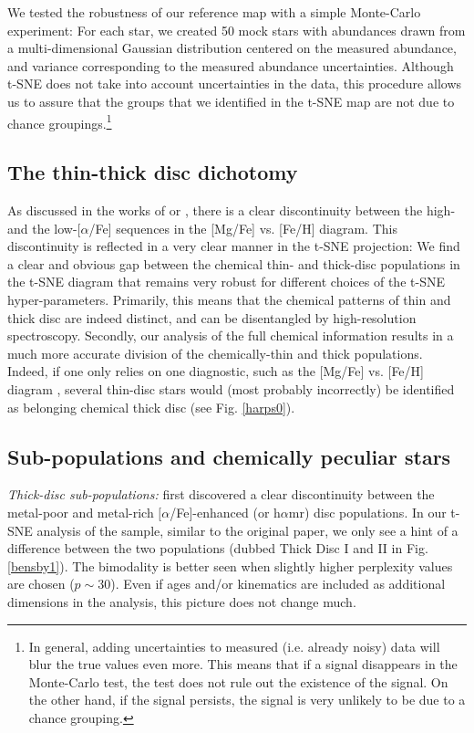 \documentclass{aa}  %
\begin{document}
We tested the robustness of our reference map with a simple Monte-Carlo experiment: For each star, we created 50 mock stars with abundances drawn from a multi-dimensional Gaussian distribution centered on the measured abundance, and variance corresponding to the measured abundance uncertainties. Although t-SNE does not take into account uncertainties in the data, this procedure allows us to assure that the groups that we identified in the t-SNE map are not due to chance groupings.\footnote{In general, adding uncertainties to measured (i.e. already noisy) data will blur the true values even more. This means that if a signal disappears in the Monte-Carlo test, the test does not rule out the existence of the signal. On the other hand, if the signal persists, the signal is very unlikely to be due to a chance grouping.} 

\subsection{The thin-thick disc dichotomy} 

As discussed in the works of \citet{Adibekyan2011, Adibekyan2012} or \citet{DelgadoMena2017}, there is a clear discontinuity between the high- and the low-[$\alpha$/Fe] sequences in the [Mg/Fe] vs. [Fe/H] diagram. This discontinuity is reflected in a very clear manner in the t-SNE projection:
We find a clear and obvious gap between the chemical thin- and thick-disc populations in the t-SNE diagram that remains very robust for different choices of the t-SNE hyper-parameters. Primarily, this means that the chemical patterns of thin and thick disc are indeed distinct, and can be disentangled by high-resolution spectroscopy. Secondly, our analysis of the full chemical information results in a much more accurate division of the chemically-thin and thick populations. Indeed, if one only relies on one diagnostic, such as the [Mg/Fe] vs. [Fe/H] diagram \citep{Adibekyan2011, DelgadoMena2017}, several thin-disc stars would (most probably incorrectly) be identified as belonging chemical thick disc (see Fig. \ref{harps0}). 

\subsection{Sub-populations and chemically peculiar stars}

{\it Thick-disc sub-populations:} \citet{Adibekyan2011} first discovered a clear discontinuity between the metal-poor and metal-rich $[\alpha$/Fe]-enhanced (or h$\alpha$mr) disc populations. In our t-SNE analysis of the \citet{Bensby2014} sample, similar to the original paper, we only see a hint of a difference between the two populations (dubbed Thick Disc I and II in Fig. \ref{bensby1}). The bimodality is better seen when slightly higher perplexity values are chosen ($p\sim 30$). Even if ages and/or kinematics are included as additional dimensions in the analysis, this picture does not change much. 
\end{document}
